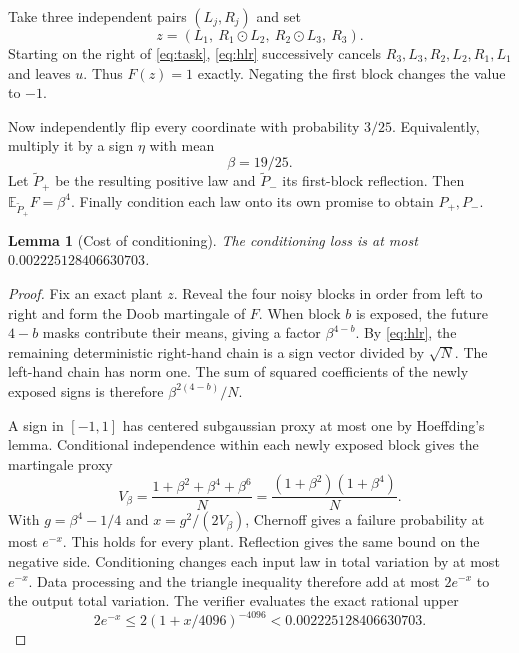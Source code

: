 \documentclass[11pt]{article}
\newtheorem{lemma}[theorem]{Lemma}
\newcommand{\E}{\mathbb E}
\begin{document}
Take three independent pairs $(L_j,R_j)$ and set
\begin{equation}
 z=(L_1,\ R_1\odot L_2,\ R_2\odot L_3,\ R_3).
 \label{eq:plant}
\end{equation}
Starting on the right of \eqref{eq:task}, \eqref{eq:hlr} successively
cancels $R_3,L_3,R_2,L_2,R_1,L_1$ and leaves $u$.
Thus $F(z)=1$ exactly. Negating the first block changes the value to $-1$.

Now independently flip every coordinate with probability $3/25$.
Equivalently, multiply it by a sign $\eta$ with mean
\[
                         \beta=19/25.
\]
Let $\widetilde P_+$ be the resulting positive law and
$\widetilde P_-$ its first-block reflection.
Then $\E_{\widetilde P_+}F=\beta^4$.
Finally condition each law onto its own promise to obtain $P_+,P_-$.

\begin{lemma}[Cost of conditioning]\label{lem:promise}
The conditioning loss is at most
$0.002225128406630703$.
\end{lemma}
\begin{proof}
Fix an exact plant $z$. Reveal the four noisy blocks in order from
left to right and form the Doob martingale of $F$.
When block $b$ is exposed, the future $4-b$ masks contribute their
means, giving a factor $\beta^{4-b}$. By \eqref{eq:hlr}, the remaining
deterministic right-hand chain is a sign vector divided by $\sqrt N$.
The left-hand chain has norm one.
The sum of squared coefficients of the newly exposed signs is therefore
$\beta^{2(4-b)}/N$.

A sign in $[-1,1]$ has centered subgaussian proxy at most one by
Hoeffding's lemma. Conditional independence within each newly exposed
block gives the martingale proxy
\[
 V_\beta=\frac{1+\beta^2+\beta^4+\beta^6}{N}
        =\frac{(1+\beta^2)(1+\beta^4)}N .
\]
With $g=\beta^4-1/4$ and $x=g^2/(2V_\beta)$, Chernoff gives a
failure probability at most $e^{-x}$. This holds for every plant.
Reflection gives the same bound on the negative side.
Conditioning changes each input law in total variation by at most
$e^{-x}$. Data processing and the triangle inequality therefore add
at most $2e^{-x}$ to the output total variation.
The verifier evaluates the exact rational upper
\[
 2e^{-x}\le2(1+x/4096)^{-4096}
          <0.002225128406630703 .
\]
\end{proof}
\end{document}
